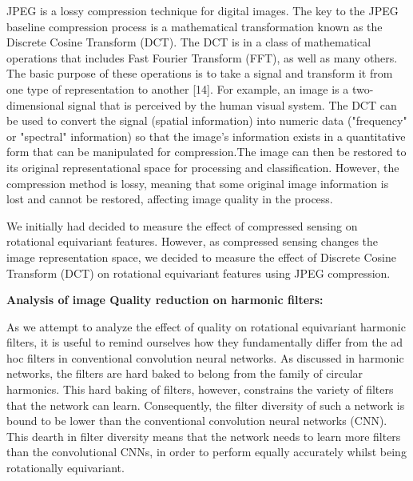 \documentclass{article}
\begin{document}
JPEG is a lossy compression technique for digital images. The key to the JPEG baseline compression process is a mathematical transformation known as the Discrete Cosine Transform (DCT). The DCT is in a class of mathematical operations that includes Fast Fourier Transform (FFT), as well as many others. The basic purpose of these operations is to take a signal and transform it from one type of representation to another [14]. For example, an image is a two-dimensional signal that is perceived by the human visual system. The DCT can be used to convert the signal (spatial information) into numeric data ("frequency" or "spectral" information) so that the image’s information exists in a quantitative form that can be manipulated for compression.The image can then be restored to its original representational space for processing and classification. However, the compression method is lossy, meaning that some original image information is lost and cannot be restored, affecting image quality in the process.

We initially had decided to measure the effect of compressed sensing on rotational equivariant features. However, as compressed sensing changes the image representation space, we decided to measure the effect of Discrete Cosine Transform (DCT) on rotational equivariant features using JPEG compression.


\textbf{Analysis of image Quality reduction on harmonic
filters:}

As we attempt to analyze the effect of quality on rotational equivariant harmonic filters, it is useful to remind ourselves how they fundamentally differ from the ad hoc filters in conventional convolution neural networks. As discussed in harmonic networks, the filters are hard baked to belong from the family of circular harmonics. This hard baking of filters, however, constrains the variety of filters that the network can learn. Consequently, the filter diversity of such a network is bound to be lower than the conventional convolution neural networks (CNN). This dearth in filter diversity means that the network needs to learn more filters than the convolutional CNNs, in order to perform equally accurately whilst being rotationally equivariant.
\end{document}
